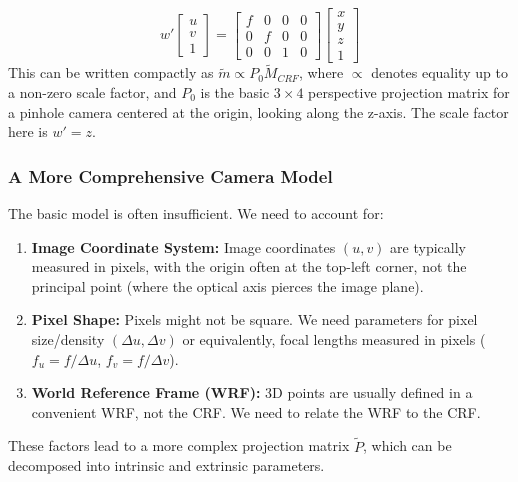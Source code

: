 \[
w' %
\begin{bmatrix}
u \\ v \\ 1
\end{bmatrix}
=
\begin{bmatrix}
f & 0 & 0 & 0 \\
0 & f & 0 & 0 \\
0 & 0 & 1 & 0
\end{bmatrix}
\begin{bmatrix}
x \\ y \\ z \\ 1
\end{bmatrix}
\]
This can be written compactly as $\tilde{m} \propto P_0 \tilde{M}_{CRF}$, where $\propto$ denotes equality up to a non-zero scale factor, and $P_0$ is the basic $3 \times 4$ perspective projection matrix for a pinhole camera centered at the origin, looking along the z-axis. The scale factor here is $w'=z$.

\subsubsection{A More Comprehensive Camera Model}

The basic model is often insufficient. We need to account for:
\begin{enumerate}
  \item \textbf{Image Coordinate System:} Image coordinates $(u, v)$ are typically measured in pixels, with the origin often at the top-left corner, not the principal point (where the optical axis pierces the image plane).
  \item \textbf{Pixel Shape:} Pixels might not be square. We need parameters for pixel size/density $(\Delta u, \Delta v)$ or equivalently, focal lengths measured in pixels ($f_u = f/\Delta u$, $f_v = f/\Delta v$).
  \item \textbf{World Reference Frame (WRF):} 3D points are usually defined in a convenient WRF, not the CRF. We need to relate the WRF to the CRF.
\end{enumerate}

These factors lead to a more complex projection matrix $\tilde{P}$, which can be decomposed into intrinsic and extrinsic parameters.


